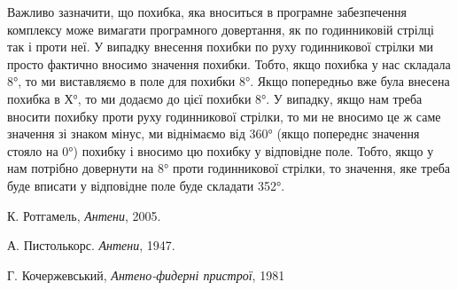 \documentclass{article}
\begin{document}
Важливо зазначити, що похибка, яка вноситься в програмне забезпечення комплексу може вимагати програмного довертання, як по годинниковій стрілці так і проти неї. У випадку внесення похибки по руху годинникової стрілки ми просто фактично вносимо значення похибки. Тобто, якщо похибка у нас складала 8°, то ми виставляємо в поле для похибки 8°. Якщо попередньо вже була внесена похибка в Х°, то ми додаємо до цієї похибки 8°. У випадку, якщо нам треба вносити похибку проти руху годинникової стрілки, то ми не вносимо це ж саме значення зі знаком мінус, ми віднімаємо від 360° (якщо попереднє значення стояло на 0°) похибку і вносимо цю похибку у відповідне поле. Тобто, якщо у нам потрібно довернути на 8° проти годинникової стрілки, то значення, яке треба буде вписати у відповідне поле буде складати 352°.


\begin{thebibliography}{99}

К. Ротгамель, \textit{Антени}, 2005.

А. Пистолькорс. \textit{Антени}, 1947.

Г. Кочержевський, \textit{Антено-фидерні пристрої}, 1981

\end{thebibliography}
\end{document}
